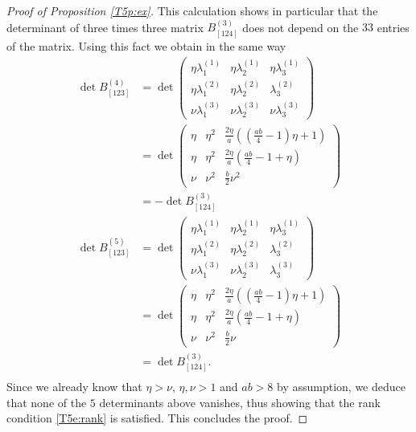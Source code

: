 \documentclass[10pt,a4paper]{amsart}
\begin{document}
\begin{proof}[Proof of Proposition \ref{T5p:ex}]
This calculation shows in particular that the determinant of three times three matrix  $B^{(3)}_{[124]}$
does not depend on the $33$ entries of the matrix. Using this fact we obtain in the same way
%
%
\begin{align*}
\det B^{(4)}_{[1 2 3]}
&=
%
\det \begin{pmatrix} \eta \lambda^{(1)}_1  & \eta   \lambda^{(1)}_2 &  \eta  \lambda^{(1)}_3 \\
\eta  \lambda^{(2)}_1 & \eta \lambda^{(2)}_2 &    \lambda^{(2)}_3 \\
 \nu   \lambda^{(3)}_1 & \nu \lambda^{(3)}_2 &   \nu \lambda^{(3)}_3 \end{pmatrix}
\\
%
&=\det\begin{pmatrix}
	\eta &\eta^2&\tfrac{2\eta}{a}\left((\tfrac{ab}{4}-1)\eta+1\right)\\
    \eta &\eta^2&\tfrac{2\eta}{a}\left(\tfrac{ab}{4}-1+\eta\right)\\
    \nu &\nu^2&   \tfrac{b}{2}\nu^2
\end{pmatrix}\\
&=    -\det B^{(3)}_{[124]}  \\%
%
\det B^{(5)}_{[1 2 3]}  &=
%
\det  \begin{pmatrix} \eta \lambda^{(1)}_1  & \eta   \lambda^{(1)}_2 &  \eta  \lambda^{(1)}_3  \\
\eta  \lambda^{(2)}_1 & \eta \lambda^{(2)}_2 &    \lambda^{(2)}_3 \\
 \nu   \lambda^{(3)}_1 & \nu \lambda^{(3)}_2 &    \lambda^{(3)}_3 
\end{pmatrix}
\\
%
&=\det\begin{pmatrix}
	\eta &\eta^2&\tfrac{2\eta}{a}\left((\tfrac{ab}{4}-1)\eta+1\right)\\
    \eta &\eta^2&\tfrac{2\eta}{a}\left(\tfrac{ab}{4}-1+\eta\right)\\
    \nu &\nu^2&     \tfrac{b}{2}\nu
\end{pmatrix}\\
&= \det B^{(3)}_{[124]}. \\
\end{align*}
Since we already know that $\eta>\nu$, $\eta,\nu>1$ and $ab>8$ by assumption, we deduce that none of the $5$ determinants above vanishes, thus showing that the rank condition \eqref{T5e:rank} is satisfied. This concludes the proof.
\end{proof}
\end{document}
